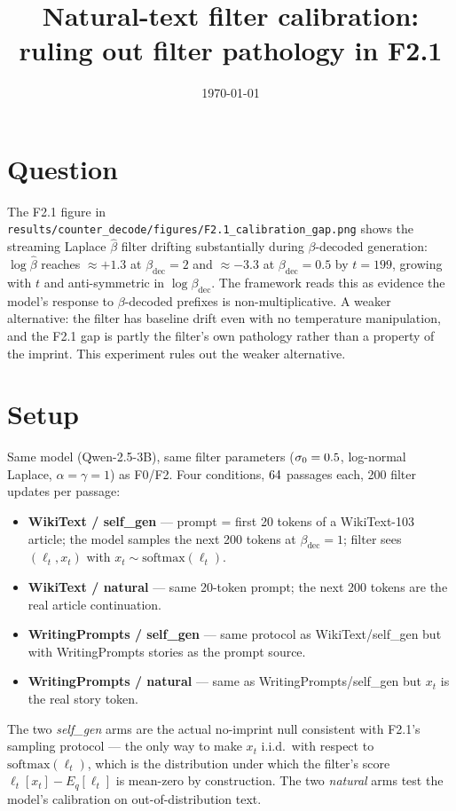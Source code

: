 \documentclass[11pt]{article}
\title{Natural-text filter calibration:\\
ruling out filter pathology in F2.1}
\author{}
\date{\today}
\begin{document}
\maketitle

\section{Question}

The F2.1 figure in \texttt{results/counter\_decode/figures/F2.1\_calibration\_gap.png}
shows the streaming Laplace $\hat\beta$ filter drifting substantially during
$\beta$-decoded generation: $\log\hat\beta$ reaches $\approx +1.3$ at
$\beta_{\text{dec}}=2$ and $\approx -3.3$ at $\beta_{\text{dec}}=0.5$ by $t=199$,
growing with $t$ and anti-symmetric in $\log\beta_{\text{dec}}$.
The framework reads this as evidence the model's response to $\beta$-decoded
prefixes is non-multiplicative.
A weaker alternative: the filter has baseline drift even with no temperature
manipulation, and the F2.1 gap is partly the filter's own pathology rather than
a property of the imprint.
This experiment rules out the weaker alternative.

\section{Setup}

Same model (Qwen-2.5-3B), same filter parameters
($\sigma_0 = 0.5$, log-normal Laplace, $\alpha = \gamma = 1$) as F0/F2.
Four conditions, $64$ passages each, 200 filter updates per passage:

\begin{itemize}
\item \textbf{WikiText / self\_gen} --- prompt = first 20 tokens of a
WikiText-103 article; the model samples the next 200 tokens at
$\beta_{\text{dec}}=1$; filter sees $(\ell_t, x_t)$ with
$x_t \sim \mathrm{softmax}(\ell_t)$.
\item \textbf{WikiText / natural} --- same 20-token prompt;
the next 200 tokens are the real article continuation.
\item \textbf{WritingPrompts / self\_gen} --- same protocol as WikiText/self\_gen
but with WritingPrompts stories as the prompt source.
\item \textbf{WritingPrompts / natural} --- same as WritingPrompts/self\_gen
but $x_t$ is the real story token.
\end{itemize}

The two \textit{self\_gen} arms are the actual no-imprint null consistent with
F2.1's sampling protocol --- the only way to make $x_t$ i.i.d.\ with respect to
$\mathrm{softmax}(\ell_t)$, which is the distribution under which the filter's
score $\ell_t[x_t] - E_q[\ell_t]$ is mean-zero by construction.
The two \textit{natural} arms test the model's calibration on out-of-distribution
text.
\end{document}
